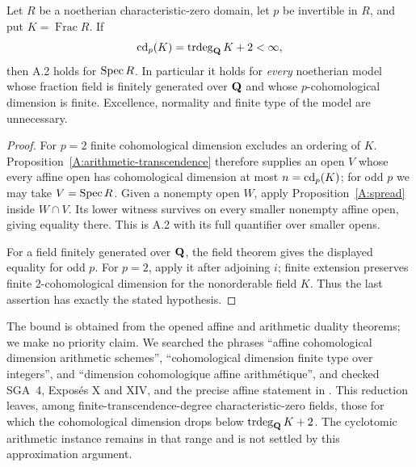 \begin{corollary}
\label{A:A2-arithmetic-maximal}
Let $R$ be a noetherian characteristic-zero domain, let $p$ be
invertible in $R$, and put $K=\operatorname{Frac}R$. If
\[
 \operatorname{cd}_p(K)=\operatorname{trdeg}_{\mathbf Q}K+2<\infty,
\]
then A.2 holds for $\operatorname{Spec} R$. In particular it holds for
\emph{every} noetherian model whose fraction field is finitely
generated over $\mathbf Q$ and whose $p$-cohomological dimension is
finite. Excellence, normality and finite type of the model
are unnecessary.
\end{corollary}
\begin{proof}
For $p=2$ finite cohomological dimension excludes an ordering of
$K$. Proposition~\ref{A:arithmetic-transcendence} therefore
supplies an open $V$ whose every affine open has cohomological
dimension at most $n=\operatorname{cd}_p(K)$; for odd $p$ we may take
$V=\operatorname{Spec} R$. Given a nonempty open $W$, apply
Proposition~\ref{A:spread} inside $W\cap V$. Its lower witness
survives on every smaller nonempty affine open, giving equality
there. This is A.2 with its full quantifier over smaller opens.

For a field finitely generated over $\mathbf Q$, the field theorem
\citep[Expos\'e X, Theorem 2.1]{A_SGA4} gives the displayed
equality for odd $p$. For $p=2$, apply it after adjoining $i$;
finite extension preserves finite $2$-cohomological dimension
for the nonorderable field $K$. Thus the last assertion has exactly
the stated hypothesis.
\end{proof}

\begin{remark}
The bound is obtained from the opened affine and arithmetic
duality theorems; we make no priority claim. We searched the
phrases ``affine cohomological dimension arithmetic schemes'',
``cohomological dimension finite type over integers'', and
``dimension cohomologique affine arithm\'etique'', and checked
SGA~4, Expos\'es X and XIV, and the precise affine statement in
\citet[Expos\'e XV, Theorem 1.1.2]{A_ILO2014}.
This reduction leaves, among finite-transcendence-degree
characteristic-zero fields, those for which the cohomological
dimension drops below $\operatorname{trdeg}_{\mathbf Q}K+2$.
The cyclotomic arithmetic instance remains in that range and
is not settled by this approximation argument.
\end{remark}
